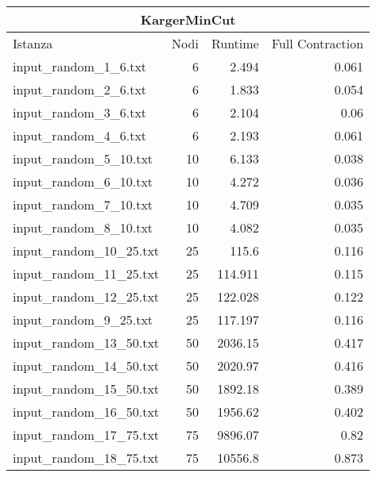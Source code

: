 \begin{table}[H]
    \centering

    \begin{tabular}{lrrr}
     \hline
     \multicolumn{4}{c}{KargerMinCut} \\
     \hline
     Istanza                    &    Nodi &        Runtime &   Full Contraction \\
     \hline
     input\_random\_1\_6.txt    &       6 &          2.494 &              0.061 \\
     input\_random\_2\_6.txt    &       6 &          1.833 &              0.054 \\
     input\_random\_3\_6.txt    &       6 &          2.104 &              0.06  \\
     input\_random\_4\_6.txt    &       6 &          2.193 &              0.061 \\
     input\_random\_5\_10.txt   &      10 &          6.133 &              0.038 \\
     input\_random\_6\_10.txt   &      10 &          4.272 &              0.036 \\
     input\_random\_7\_10.txt   &      10 &          4.709 &              0.035 \\
     input\_random\_8\_10.txt   &      10 &          4.082 &              0.035 \\
     input\_random\_10\_25.txt  &      25 &        115.6   &              0.116 \\
     input\_random\_11\_25.txt  &      25 &        114.911 &              0.115 \\
     input\_random\_12\_25.txt  &      25 &        122.028 &              0.122 \\
     input\_random\_9\_25.txt   &      25 &        117.197 &              0.116 \\
     input\_random\_13\_50.txt  &      50 &       2036.15  &              0.417 \\
     input\_random\_14\_50.txt  &      50 &       2020.97  &              0.416 \\
     input\_random\_15\_50.txt  &      50 &       1892.18  &              0.389 \\
     input\_random\_16\_50.txt  &      50 &       1956.62  &              0.402 \\
     input\_random\_17\_75.txt  &      75 &       9896.07  &              0.82  \\
     input\_random\_18\_75.txt  &      75 &      10556.8   &              0.873 \\

\end{tabular}
\end{table}
